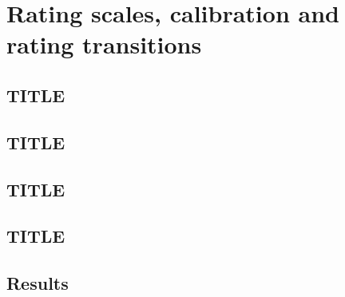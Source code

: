 \chapter{Rating scales, calibration and rating transitions}
\label{ch:ratings}


\section{TITLE}
\label{sec:m7}


\section{TITLE}
\label{sec:m8}


\section{TITLE}
\label{sec:m9}


\section{TITLE}
\label{sec:m36}


\section{Results}
\label{sec:results-ratings}

